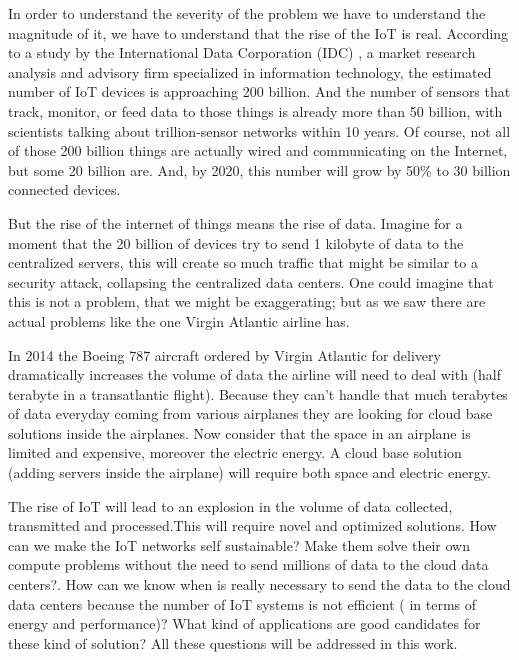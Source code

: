 In order to understand the severity of the problem we have to understand the
magnitude of it, we have to understand that the rise of the IoT
is real.  According to a study by the International Data Corporation (IDC)
\cite{IDC}, a market research analysis and advisory firm specialized in
information technology, the estimated number of IoT devices is approaching  200
billion. And the number of sensors that track, monitor, or feed data to those
things is already more than 50 billion, with scientists talking about
trillion-sensor networks within 10 years. Of course, not all of those 200
billion things are actually wired and communicating on the Internet, but some
20 billion are. And, by 2020, this number will grow by 50\% to 30 billion
connected devices.\cite{EMC1}

But the rise of the internet of things means the rise of data. Imagine for a
moment that the 20 billion of devices try to send 1 kilobyte of data to the
centralized servers, this will create so much traffic that might be similar to
a security attack, collapsing the centralized data centers. One could imagine
that this is not a problem, that we might be exaggerating; but as we saw there
are actual problems like the one Virgin Atlantic airline has.

In 2014 the Boeing 787 aircraft ordered by Virgin Atlantic for delivery
dramatically increases the volume of data the airline will need to deal with
(half terabyte in a transatlantic flight). \cite{Finnegan} Because they can't
handle that much terabytes of data everyday coming from various airplanes they
are looking for cloud base solutions inside the airplanes. Now consider that
the space in an airplane is limited and expensive, moreover the electric
energy. A cloud base solution (adding servers inside the airplane) will require
both space and electric energy.



The rise of IoT will lead to an explosion in the volume of data collected,
transmitted and processed.This will require novel and optimized solutions.  How
can we make the IoT networks self sustainable? Make them solve their own
compute problems without the need to send millions of data to the cloud data
centers?. How can we know when is really necessary to send the data to the cloud
data centers because the number of IoT systems is not efficient ( in terms of
energy and performance)? What kind of applications are good candidates for
these kind of solution? All these questions will be addressed in this work. 

